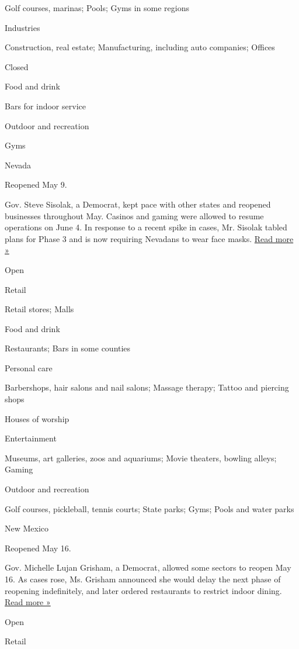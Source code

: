 Golf courses, marinas; Pools; Gyms in some regions

Industries

Construction, real estate; Manufacturing, including auto companies;
Offices

Closed

Food and drink

Bars for indoor service

Outdoor and recreation

Gyms

Nevada

Reopened May 9.

Gov. Steve Sisolak, a Democrat, kept pace with other states and reopened
businesses throughout May. Casinos and gaming were allowed to resume
operations on June 4. In response to a recent spike in cases, Mr.
Sisolak tabled plans for Phase 3 and is now requiring Nevadans to wear
face masks.
\href{https://www.rgj.com/story/news/2020/07/27/sisolak-announcement-live-covid-nevada-coronavirus-update/5523115002/}{Read
more »}

Open

Retail

Retail stores; Malls

Food and drink

Restaurants; Bars in some counties

Personal care

Barbershops, hair salons and nail salons; Massage therapy; Tattoo and
piercing shops

Houses of worship

Entertainment

Museums, art galleries, zoos and aquariums; Movie theaters, bowling
alleys; Gaming

Outdoor and recreation

Golf courses, pickleball, tennis courts; State parks; Gyms; Pools and
water parks

New Mexico

Reopened May 16.

Gov. Michelle Lujan Grisham, a Democrat, allowed some sectors to reopen
May 16. As cases rose, Ms. Grisham announced she would delay the next
phase of reopening indefinitely, and later ordered restaurants to
restrict indoor dining.
\href{https://www.krqe.com/health/coronavirus-new-mexico/new-mexico-indoor-dining-reopening-plans-criteria-remain-unclear/}{Read
more »}

Open

Retail

